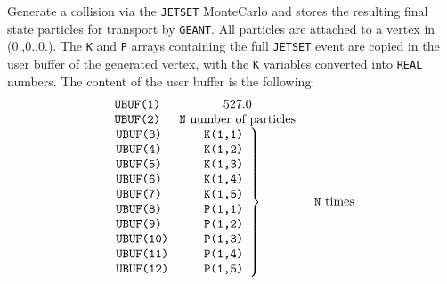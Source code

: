 Generate a \Pem\Pep collision via the {\tt JETSET} MonteCarlo and stores
the resulting final state particles for transport by {\tt GEANT}. All
particles are attached to a vertex in (0.,0.,0.). The {\tt K} and {\tt P}
arrays containing the full {\tt JETSET} event are copied in the user
buffer of the generated vertex, with the {\tt K} variables converted into
{\tt REAL} numbers. The content of the user buffer is the following:
\[
\begin{array}{ll}
\begin{array}{r@{}lc}
\mbox{\tt UBUF(} & \mbox{\tt 1)~} & 527.0 \\
\mbox{\tt UBUF(} & \mbox{\tt 2)~} & \mbox{{\tt N} number of particles}
\end{array} \\
\left .
\begin{array}{r@{}l@{\hspace{1cm}}l}
\mbox{\tt UBUF(} & \mbox{\tt 3)} & \mbox{\tt K(1,1)} \\
\mbox{\tt UBUF(} & \mbox{\tt 4)} & \mbox{\tt K(1,2)} \\
\mbox{\tt UBUF(} & \mbox{\tt 5)} & \mbox{\tt K(1,3)} \\
\mbox{\tt UBUF(} & \mbox{\tt 6)} & \mbox{\tt K(1,4)} \\
\mbox{\tt UBUF(} & \mbox{\tt 7)} & \mbox{\tt K(1,5)} \\
\mbox{\tt UBUF(} & \mbox{\tt 8)} & \mbox{\tt P(1,1)} \\
\mbox{\tt UBUF(} & \mbox{\tt 9)} & \mbox{\tt P(1,2)} \\
\mbox{\tt UBUF(} & \mbox{\tt 10)} & \mbox{\tt P(1,3)} \\
\mbox{\tt UBUF(} & \mbox{\tt 11)} & \mbox{\tt P(1,4)} \\
\mbox{\tt UBUF(} & \mbox{\tt 12)} & \mbox{\tt P(1,5)}
\end{array} \right \} & \mbox{{\tt N} times}
\end{array}
\]
